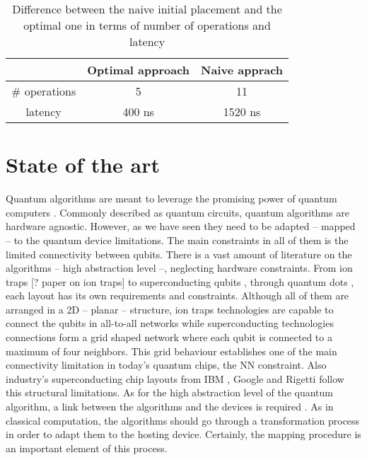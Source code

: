 \begin{table}[htbp]
\caption{\label{tab:org1f7fe68}
Difference between the naive initial placement and the optimal one in terms of number of operations and latency}
\centering
\begin{tabular}{ccc}
\hline
 & Optimal approach & Naive apprach\\
\hline
\# operations & 5 & 11\\
latency & 400 ns & 1520 ns\\
\hline
\end{tabular}
\end{table}

\section*{State of the art}
\label{sec:org21c4142}
Quantum algorithms are meant to leverage the promising power of quantum computers \cite{coles18:quant_algor_implem_begin}.
Commonly described as quantum circuits, quantum algorithms are hardware agnostic.
However, as we have seen they need to be adapted -- mapped -- to the quantum device limitations.
The main constraints in all of them is the limited connectivity between qubits.
There is a vast amount of literature on the algorithms -- high abstraction level --, neglecting hardware constraints.
From ion traps [? paper on ion traps] to superconducting qubits \cite{Barends_2014,Versluis_2017}, through quantum dots \cite{Hill_2015,Li_2018}, each layout has its own requirements and constraints.
Although all of them are arranged in a 2D -- planar -- structure, ion traps technologies are capable to connect the qubits in all-to-all networks while superconducting technologies connections form a grid shaped network where each qubit is connected to a maximum of four neighbors.
This grid behaviour establishes one of the main connectivity limitation in today's quantum chips, the NN constraint.
Also industry's superconducting chip layouts from IBM \cite{IBM_QX}, Google \cite{boixo16:charac_quant_suprem_near_term_devic} and Rigetti \cite{Sete_2016} follow this structural limitations.
As for the high abstraction level of the quantum algorithm, a link between the algorithms and the devices is required \cite{Fu_2016}.
As in classical computation, the algorithms should go through a transformation process in order to adapt them to the hosting device.
Certainly, the mapping procedure is an important element of this process.

